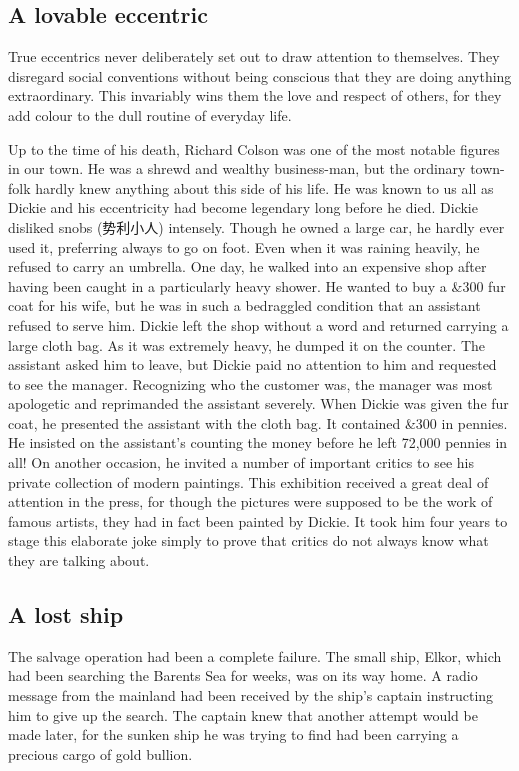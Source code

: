 \documentclass[11pt]{article}
\begin{document}
\subsection{A lovable eccentric}
\label{sec-1-31}

True eccentrics never deliberately set out to draw attention to themselves. They disregard social conventions without being conscious that they are doing anything extraordinary. This invariably wins them the love and respect of others, for they add colour to the dull routine of everyday life. 

Up to the time of his death, Richard Colson was one of the most notable figures in our town. He was a shrewd and wealthy business-man, but the ordinary town-folk hardly knew anything about this side of his life. He was known to us all as Dickie and his eccentricity had become legendary long before he died. Dickie disliked snobs (势利小人) intensely. Though he owned a large car, he hardly ever used it, preferring always to go on foot. Even when it was raining heavily, he refused to carry an umbrella. One day, he walked into an expensive shop after having been caught in a particularly heavy shower. He wanted to buy a \&300 fur coat for his wife, but he was in such a bedraggled condition that an assistant refused to serve him. Dickie left the shop without a word and returned carrying a large cloth bag. As it was extremely heavy, he dumped it on the counter. The assistant asked him to leave, but Dickie paid no attention to him and requested to see the manager. Recognizing who the customer was, the manager was most apologetic and reprimanded the assistant severely. When Dickie was given the fur coat, he presented the assistant with the cloth bag. It contained \&300 in pennies. He insisted on the assistant's counting the money before he left 72,000 pennies in all! On another occasion, he invited a number of important critics to see his private collection of modern paintings. This exhibition received a great deal of attention in the press, for though the pictures were supposed to be the work of famous artists, they had in fact been painted by Dickie. It took him four years to stage this elaborate joke simply to prove that critics do not always know what they are talking about.
\subsection{A lost ship}
\label{sec-1-32}

The salvage operation had been a complete failure. The small ship, Elkor, which had been searching the Barents Sea for weeks, was on its way home. A radio message from the mainland had been received by the ship's captain instructing him to give up the search. The captain knew that another attempt would be made later, for the sunken ship he was trying to find had been carrying a precious cargo of gold bullion. 
\end{document}
